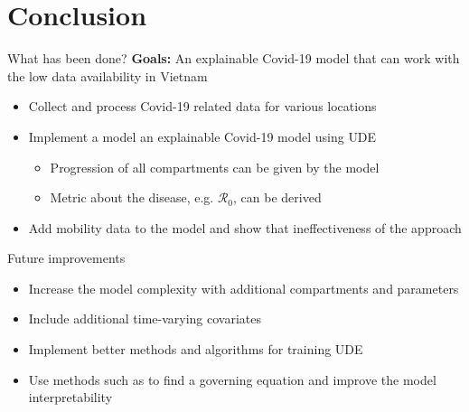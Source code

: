 \section{Conclusion}

\begin{frame}{What has been done?}
    \textbf{Goals:} An explainable Covid-19 model that can work with the low data availability in Vietnam
    \begin{itemize}
        \item<2-> Collect and process Covid-19 related data for various locations
        \item<3-> Implement a model an explainable Covid-19 model using \gls{UDE}
        \begin{itemize}
            \item Progression of all compartments can be given by the model
            \item Metric about the disease, e.g. $\mathcal{R}_0$, can be derived
        \end{itemize}
        \item<4-> Add mobility data to the model and show that ineffectiveness of the approach
    \end{itemize}
\end{frame}

\begin{frame}{Future improvements}
    \begin{itemize}
        \item<1-> Increase the model complexity with additional compartments and parameters
        \item<2-> Include additional time-varying covariates
        \item<3-> Implement better methods and algorithms for training \gls{UDE}
        \item<4-> Use methods such as  to find a governing equation and improve the model interpretability
    \end{itemize}
\end{frame}